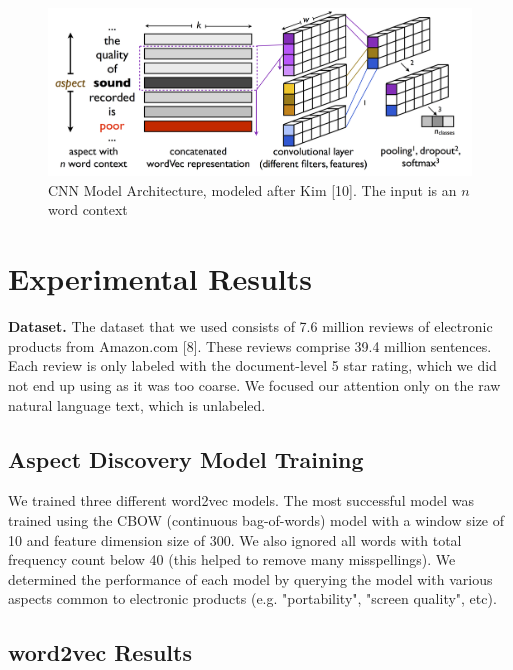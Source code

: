 \documentclass{article} %
\begin{document}
\begin{figure}[ht]
\begin{center}
\includegraphics[width=\columnwidth]{model_architecture.png}
\end{center}
\caption{CNN Model Architecture, modeled after Kim [10]. The input is an $n$ word context}
\label{architecture}
\end{figure}


\section{Experimental Results} 

\textbf{Dataset.} The dataset that we used consists of 7.6 million reviews of electronic products from Amazon.com [8]. These reviews comprise 39.4 million sentences. Each review is only labeled with the document-level 5 star rating, which we did not end up using as it was too coarse. We focused our attention only on the raw natural language text, which is unlabeled.


\subsection{Aspect Discovery Model Training} 

We trained three different word2vec models. The most successful model was trained using the CBOW (continuous bag-of-words) model with a window size of 10 and feature dimension size of 300. We also ignored all words with total frequency count below 40 (this helped to remove many misspellings). We determined the performance of each model by querying the model with various aspects common to electronic products (e.g. "portability", "screen quality", etc).

\subsection{word2vec Results}
\end{document}
